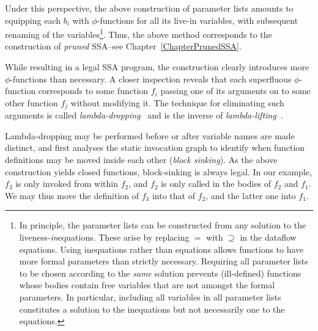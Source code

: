 Under this perspective, the above construction of parameter lists
amounts to equipping each $b_i$ with $\phi$-functions for all its
live-in variables, with subsequent renaming of the
variables\footnote{In principle, the parameter lists can be
constructed from any solution to the
liveness-\emph{in}equations. These arise by replacing $=$ with
$\supseteq$ in the dataflow equations. Using inequations rather than
equations allows functions to have more formal parameters than
strictly necessary. Requiring all parameter lists to be chosen
according to the
\emph{same} solution prevents (ill-defined) functions whose bodies contain free
variables that are not amongst the formal parameters.  In particular,
including all variables in all parameter lists constitutes a solution
to the inequations but not necessarily one to the equations.}. Thus,
the above method corresponds to the construction of \emph{pruned}
SSA--see Chapter~\ref{ChapterPrunedSSA}.

While resulting in a legal SSA program, the construction clearly
introduces more $\phi$-functions than necessary. A closer inspection
reveals that each superfluous $\phi$-function corresponds to some
function $f_i$ passing one of its arguments on to some other function
$f_j$ without modifying it. The technique for eliminating such
arguments is called
\emph{lambda-dropping}~\cite{DBLP:journals/tcs/DanvyS00} and is the inverse of
\emph{lambda-lifting}~\cite{DBLP:conf/fpca/Johnsson85}.

Lambda-dropping may be performed before or after variable names are
made distinct, and first analyses the static invocation graph to
identify when function definitions may be moved inside each other
(\emph{block sinking}). As the above construction yields closed
functions, block-sinking is always legal. In our example, $f_3$ is
only invoked from within $f_2$, and $f_2$ is only called in the bodies
of $f_2$ and $f_1$.  We may thus move the definition of $f_3$ into
that of $f_2$, and the latter one into $f_1$.

